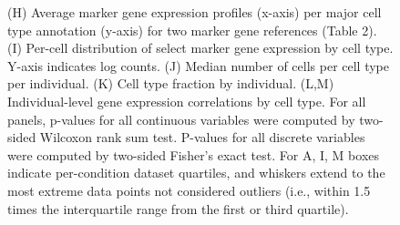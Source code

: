 \begin{figure}[ht]
{        (H) Average marker gene expression profiles (x-axis) per major cell type annotation (y-axis) for two marker gene references (Table 2). (I) Per-cell distribution of select marker gene expression by cell type. Y-axis indicates log counts. 
        (J) Median number of cells per cell type per individual. 
        (K) Cell type fraction by individual. (L,M) Individual-level gene expression correlations by cell type. For all panels, p-values for all continuous variables were computed by two-sided Wilcoxon rank sum test. P-values for all discrete variables were computed by two-sided Fisher’s exact test. For A, I, M boxes indicate per-condition dataset quartiles, and whiskers extend to the most extreme data points not considered outliers (i.e., within 1.5 times the interquartile range from the first or third quartile).
    }
    \label{fig:snRNA_quality_annotation}
\end{figure}